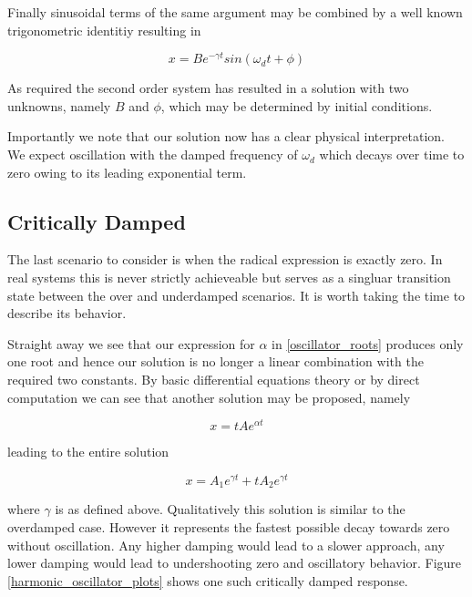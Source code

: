 \documentclass[11pt]{book}
\begin{document}
Finally sinusoidal terms of the same argument may be combined by a
well known trigonometric identitiy resulting in

\begin{equation*}
  x = Be^{- \gamma t}sin(\omega_d t + \phi)
\end{equation*}

As required the second order system has resulted in a solution with
two unknowns,
namely $B$ and $\phi$, which may be determined by initial conditions.

Importantly we note that our solution now has a clear physical
interpretation.  We expect oscillation with the damped frequency of
$\omega_d$ which decays over time to zero owing to its leading
exponential term.
\subsection*{Critically Damped}

The last scenario to consider is when the radical expression is
exactly zero.  In real systems this is never strictly achieveable but
serves as a singluar transition state between the over and underdamped
scenarios.  It is worth
taking the time to describe its behavior.

Straight away we see that our expression for $\alpha$ in
\eqref{oscillator_roots} produces only
one root and hence our solution is no longer a linear combination with
the required two constants.  By basic differential equations theory or
by direct computation we can see that another solution may be
proposed, namely

\begin{equation*}
  x = tAe^{\alpha t}
\end{equation*}

leading to the entire solution

\begin{equation*}
  x = A_1e^{\gamma t} + t A_2e^{\gamma t}
\end{equation*}

where $\gamma$ is as defined above. Qualitatively this solution is similar to the overdamped case.
However it represents the fastest possible decay towards zero without
oscillation.  Any higher damping would lead to a slower approach, any
lower damping would lead to undershooting zero and oscillatory
behavior.  Figure \ref{harmonic_oscillator_plots} shows one such
critically damped response.
\end{document}
